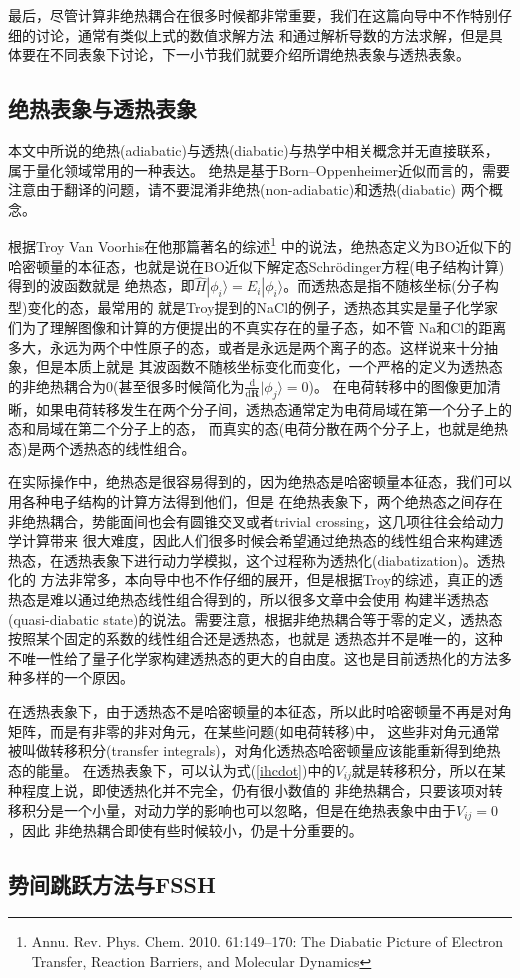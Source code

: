 \documentclass{article}
\numberwithin{equation}{section}
\begin{document}
        最后，尽管计算非绝热耦合在很多时候都非常重要，我们在这篇向导中不作特别仔细的讨论，通常有类似上式的数值求解方法
        和通过解析导数的方法求解，但是具体要在不同表象下讨论，下一小节我们就要介绍所谓绝热表象与透热表象。
      \subsection{绝热表象与透热表象}
        本文中所说的绝热(adiabatic)与透热(diabatic)与热学中相关概念并无直接联系，属于量化领域常用的一种表达。
        绝热是基于Born–Oppenheimer近似而言的，需要注意由于翻译的问题，请不要混淆非绝热(non-adiabatic)和透热(diabatic)
        两个概念。

        根据Troy Van Voorhis在他那篇著名的综述\footnote{Annu. Rev. Phys. Chem. 2010. 61:149–170: The Diabatic Picture of Electron Transfer, Reaction Barriers, and Molecular Dynamics}
        中的说法，绝热态定义为BO近似下的哈密顿量的本征态，也就是说在BO近似下解定态Schr\"odinger方程(电子结构计算)得到的波函数就是
        绝热态，即$\hat{H}|\phi_i\rangle=E_i|\phi_i\rangle$。而透热态是指不随核坐标(分子构型)变化的态，最常用的
        就是Troy提到的NaCl的例子，透热态其实是量子化学家们为了理解图像和计算的方便提出的不真实存在的量子态，如不管
        Na和Cl的距离多大，永远为两个中性原子的态，或者是永远是两个离子的态。这样说来十分抽象，但是本质上就是
        其波函数不随核坐标变化而变化，一个严格的定义为透热态的非绝热耦合为0(甚至很多时候简化为$\frac{\mathrm{d}}{\mathrm{d}\mathbf{R}}|\phi_j\rangle=0$)。
        在电荷转移中的图像更加清晰，如果电荷转移发生在两个分子间，透热态通常定为电荷局域在第一个分子上的态和局域在第二个分子上的态，
        而真实的态(电荷分散在两个分子上，也就是绝热态)是两个透热态的线性组合。

        在实际操作中，绝热态是很容易得到的，因为绝热态是哈密顿量本征态，我们可以用各种电子结构的计算方法得到他们，但是
        在绝热表象下，两个绝热态之间存在非绝热耦合，势能面间也会有圆锥交叉或者trivial crossing，这几项往往会给动力学计算带来
        很大难度，因此人们很多时候会希望通过绝热态的线性组合来构建透热态，在透热表象下进行动力学模拟，这个过程称为透热化(diabatization)。透热化的
        方法非常多，本向导中也不作仔细的展开，但是根据Troy的综述，真正的透热态是难以通过绝热态线性组合得到的，所以很多文章中会使用
        构建半透热态(quasi-diabatic state)的说法。需要注意，根据非绝热耦合等于零的定义，透热态按照某个固定的系数的线性组合还是透热态，也就是
        透热态并不是唯一的，这种不唯一性给了量子化学家构建透热态的更大的自由度。这也是目前透热化的方法多种多样的一个原因。

        在透热表象下，由于透热态不是哈密顿量的本征态，所以此时哈密顿量不再是对角矩阵，而是有非零的非对角元，在某些问题(如电荷转移)中，
        这些非对角元通常被叫做转移积分(transfer integrals)，对角化透热态哈密顿量应该能重新得到绝热态的能量。
        在透热表象下，可以认为式(\ref{ihcdot})中的$V_{ij}$就是转移积分，所以在某种程度上说，即使透热化并不完全，仍有很小数值的
        非绝热耦合，只要该项对转移积分是一个小量，对动力学的影响也可以忽略，但是在绝热表象中由于$V_{ij}=0$，因此
        非绝热耦合即使有些时候较小，仍是十分重要的。
      \subsection{势间跳跃方法与FSSH}
  
\end{document}
